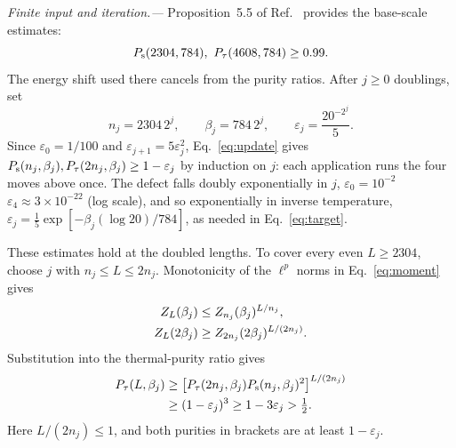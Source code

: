 \documentclass[aps,prl,reprint,amsmath,amssymb,nofootinbib,raggedbottom]{revtex4-2}
\begin{document}
\emph{Finite input and iteration.---}
Proposition~5.5 of Ref.~\cite{source} provides the base-scale estimates:
\begin{equation}
 \Ps(2304,784),\ \Pt(4608,784)\ge0.99.
 \label{eq:input}
\end{equation}
The energy shift used there cancels from the purity ratios.
After $j\ge0$ doublings, set
\begin{equation}
 n_j=2304\,2^j,\qquad \beta_j=784\,2^j,\qquad
 \varepsilon_j=\frac{20^{-2^j}}5.
 \label{eq:scales}
\end{equation}
Since $\varepsilon_0=1/100$ and $\varepsilon_{j+1}=5\varepsilon_j^2$,
Eq.~\eqref{eq:update} gives
$P_{\mathrm s}(n_j,\beta_j),P_{\tau}(2n_j,\beta_j)\ge1-\varepsilon_j$ by induction on $j$:
each application runs the four moves above once.
The defect falls doubly exponentially in $j$,
$\varepsilon_0=10^{-2}$\,\,$\varepsilon_4\approx3\times10^{-22}$ (log scale),
and so exponentially in inverse temperature,
$\varepsilon_j=\frac15\exp[-\beta_j(\log20)/784]$, as needed in Eq.~\eqref{eq:target}.

These estimates hold at the doubled lengths. To cover every even
$L\ge2304$, choose $j$ with $n_j\le L\le2n_j$.
Monotonicity of the $\ell^p$ norms in Eq.~\eqref{eq:moment} gives
\begin{align}
 Z_L(\beta_j)&\le Z_{n_j}(\beta_j)^{L/n_j},\notag\\
 Z_L(2\beta_j)&\ge Z_{2n_j}(2\beta_j)^{L/(2n_j)}.
 \label{eq:moments}
\end{align}
Substitution into the thermal-purity ratio gives
\begin{align}
 P_{\tau}(L,\beta_j)
 &\ge\bigl[P_{\tau}(2n_j,\beta_j)P_{\mathrm s}(n_j,\beta_j)^2\bigr]^{L/(2n_j)}\notag\\
 &\ge(1-\varepsilon_j)^3\ge1-3\varepsilon_j>\tfrac12.
 \label{eq:interpolate}
\end{align}
Here $L/(2n_j)\le1$, and both purities in brackets are at least
$1-\varepsilon_j$.
\end{document}
